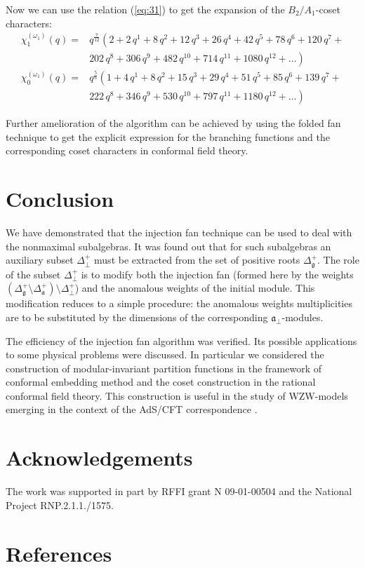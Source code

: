 \documentclass[12pt]{iopart}
\theoremstyle{definition}
\begin{document}
Now we can use the relation (\ref{eq:31}) to get the expansion of the $B_2/A_1$-coset characters:
\begin{equation*}
  \label{eq:35}
  \begin{array}{cc}
    \chi^{(\omega_1)}_{1}(q)= & q^{\frac{7}{12}}\left( 2+2\,q^{1}+8\,q^{2}+12\,q^{3}+26\,q^{4}+42\,q^{5}+78\,q^{6}+120\,q^{7}+\right. \\
    & \left. 202\,q^{8}+306\,q^{9}+482\,q^{10}+714\,q^{11}+1080\,q^{12}+\dots \right)\\
    \chi^{(\omega_1)}_{0}(q) = & q^{\frac{5}{6}}\left(1 + 4\,q^{1}+ 8\,q^{2}+ 15\,q^{3}+ 29\,q^{4}+ 51\,q^{5}+ 85\,q^{6}+ 139\,q^{7}+\right. \\
    &\left. 222\,q^{8}+ 346\,q^{9}+ 530\,q^{10}+ 797\,q^{11}+ 1180\,q^{12}+\dots\right)
  \end{array}
\end{equation*}

Further amelioration of the algorithm can be achieved by using
the folded fan technique \cite{il2010folded} to get the explicit expression
for the branching functions and the corresponding coset characters in conformal field theory.

\section{Conclusion}
\label{sec:conclusion}
We have demonstrated that the injection fan technique can be used to deal with the nonmaximal subalgebras.
It was found out that for such subalgebras an auxiliary subset $\Delta^{+}_{\bot}$ must be extracted
from the set of positive roots $\Delta_{\mathfrak{g}}^{+}$.
The role of the subset $\Delta^{+}_{\bot}$ is to modify both the injection fan (formed here by the
weights $\left(\Delta_{\mathfrak{g}}^{+} \setminus  \Delta_{\mathfrak{a}}^{+}\right) \setminus \Delta^{+}_{\bot}$)
and the anomalous weights of the initial module.
This modification reduces to a simple procedure:
the anomalous weights multiplicities are to be substituted by the dimensions of the corresponding ${\mathfrak{a}}_{\bot}$-modules.

The efficiency of the injection fan algorithm was verified.
Its possible applications to some physical problems were discussed.
In particular we considered the construction of modular-invariant partition functions
in the framework of conformal embedding method and the coset construction in the rational conformal field theory.
This construction is useful in the study of WZW-models
emerging in the context of the AdS/CFT correspondence \cite{Maldacena:2000hw,Maldacena:2000kv,Maldacena:2001km}.

\section{Acknowledgements}
The work was supported in
part by RFFI grant N 09-01-00504 and the National Project RNP.2.1.1./1575.

\section*{References}
{}

\end{document}
